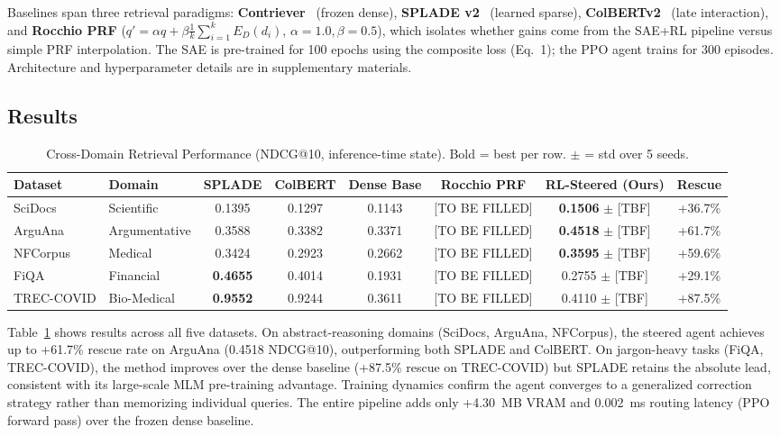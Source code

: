 \documentclass[sigconf]{acmart}
\begin{document}
Baselines span three retrieval paradigms: \textbf{Contriever}~\cite{izacard2022} (frozen dense), \textbf{SPLADE v2}~\cite{formal2021spladev2} (learned sparse), \textbf{ColBERTv2}~\cite{santhanam2022} (late interaction), and \textbf{Rocchio PRF} ($q' = \alpha q + \beta \frac{1}{k}\sum_{i=1}^{k} E_D(d_i)$, $\alpha{=}1.0, \beta{=}0.5$), which isolates whether gains come from the SAE+RL pipeline versus simple PRF interpolation. The SAE is pre-trained for 100 epochs using the composite loss (Eq.~1); the PPO agent trains for 300 episodes. Architecture and hyperparameter details are in supplementary materials.

\subsection{Results}

\begin{table}[t]
  \caption{Cross-Domain Retrieval Performance (NDCG@10, inference-time state). Bold = best per row. $\pm$ = std over 5 seeds.}
  \label{tab:results}
  \begin{tabular}{llcccccc}
    \toprule
    Dataset & Domain & SPLADE & ColBERT & Dense Base & Rocchio PRF & RL-Steered (Ours) & Rescue\\
    \midrule
    SciDocs & Scientific & 0.1395 & 0.1297 & 0.1143 & [TO BE FILLED] & \textbf{0.1506} $\pm$ [TBF] & +36.7\%\\
    ArguAna & Argumentative & 0.3588 & 0.3382 & 0.3371 & [TO BE FILLED] & \textbf{0.4518} $\pm$ [TBF] & +61.7\%\\
    NFCorpus & Medical & 0.3424 & 0.2923 & 0.2662 & [TO BE FILLED] & \textbf{0.3595} $\pm$ [TBF] & +59.6\%\\
    FiQA & Financial & \textbf{0.4655} & 0.4014 & 0.1931 & [TO BE FILLED] & 0.2755 $\pm$ [TBF] & +29.1\%\\
    TREC-COVID & Bio-Medical & \textbf{0.9552} & 0.9244 & 0.3611 & [TO BE FILLED] & 0.4110 $\pm$ [TBF] & +87.5\%\\
    \bottomrule
  \end{tabular}
\end{table}

Table~\ref{tab:results} shows results across all five datasets. On abstract-reasoning domains (SciDocs, ArguAna, NFCorpus), the steered agent achieves up to +61.7\% rescue rate on ArguAna (0.4518 NDCG@10), outperforming both SPLADE and ColBERT. On jargon-heavy tasks (FiQA, TREC-COVID), the method improves over the dense baseline (+87.5\% rescue on TREC-COVID) but SPLADE retains the absolute lead, consistent with its large-scale MLM pre-training advantage. Training dynamics confirm the agent converges to a generalized correction strategy rather than memorizing individual queries. The entire pipeline adds only +4.30~MB VRAM and 0.002~ms routing latency (PPO forward pass) over the frozen dense baseline.
\end{document}
